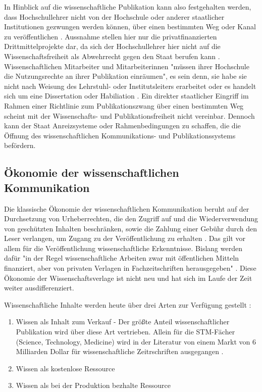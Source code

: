 In Hinblick auf die wissenschaftliche Publikation kann also festgehalten werden, dass Hochschullehrer nicht von der Hochschule oder anderer staatlicher Institutionen gezwungen werden können, über einen bestimmten Weg oder Kanal zu veröffentlichen \cite{spindler_2006_rechtloa}. Aussnahme stellen hier nur die privatfinanzierten Drittmittelprojekte dar, da sich der Hochschullehrer hier nicht auf die Wissenschaftsfreiheit als Abwehrrecht gegen den Staat berufen kann \cite{spindler_2006_rechtloa}. Wissenschaftlichen Mitarbeiter und Mitarbeiterinnen "müssen ihrer Hochschule die Nutzungsrechte an ihrer Publikation einräumen", es sein denn, sie habe sie nicht nach Weisung des Lehrstuhl- oder Institutsleiters erarbeitet oder es handelt sich um eine Dissertation oder Habiliation \cite{spindler_2006_rechtloa}. Ein direkter staatlicher Eingriff im Rahmen einer Richtlinie zum Publikationszwang über einen bestimmten Weg scheint mit der Wissenschafts- und Publikationsfreiheit nicht vereinbar. Dennoch kann der Staat Anreizsysteme oder Rahmenbedingungen zu schaffen, die die Öffnung des wissenschaftlichen Kommunikations- und Publikationssystems befördern.

\subsection{Ökonomie der wissenschaftlichen Kommunikation}
Die klassische Ökonomie der wissenschaftlichen Kommunikation beruht auf der Durchsetzung von Urheberrechten, die den Zugriff auf und die Wiederverwendung von geschützten Inhalten beschränken, sowie die Zahlung einer Gebühr durch den Leser verlangen, um Zugang zu der Veröffentlichung zu erhalten \cite{CREATe_2014}. Das gilt vor allem für die Veröffentlichung wissenschaftliche Erkenntnisse. Bislang werden dafür "in der Regel wissenschaftliche Arbeiten zwar mit öffentlichen Mitteln finanziert, aber von privaten Verlagen in Fachzeitschriften herausgegeben" \cite{WD_bundestag_2009}. Diese Ökonomie der Wissenschaftsverlage ist nicht neu und hat sich im Laufe der Zeit weiter ausdifferenziert.

Wissenschaftliche Inhalte werden heute über drei Arten zur Verfügung gestellt \cite{cope2014future}:
\begin{enumerate}
\item Wissen als Inhalt zum Verkauf - Der größte Anteil wissenschaftlicher Publikation wird über diese Art vertrieben. Allein für die STM-Fächer (Science, Technology, Medicine) wird in der Literatur von einem Markt von 6 Milliarden Dollar für wissenschaftliche Zeitrschriften ausgegangen \cite{cope2014future}.
\item Wissen als kostenlose Ressource
\item Wissen als bei der Produktion bezhalte Ressource
\end{enumerate}

